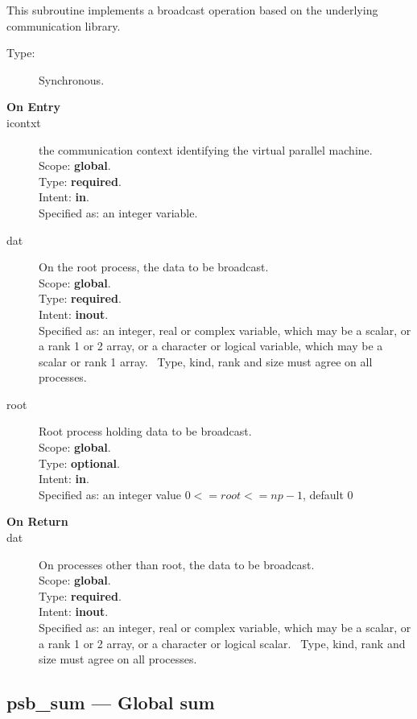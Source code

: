 This subroutine implements a broadcast operation based on the
underlying communication library. 
\begin{description}
\item[Type:] Synchronous.
\item[\bf  On Entry ]
\item[icontxt] the communication context identifying the virtual
  parallel machine.\\
Scope: {\bf global}.\\
Type: {\bf required}.\\
Intent: {\bf in}.\\
Specified as: an integer variable.
\item[dat] On the root process, the data to be broadcast.\\
Scope: {\bf global}.\\
Type: {\bf required}.\\
Intent: {\bf inout}.\\
Specified as: an integer, real or complex variable, which may be a
scalar, or a rank 1 or 2 array, or a character or logical variable,
which may be a scalar or rank 1 array. \
Type, kind, rank and size must agree on all processes.
\item[root] Root process holding data to be broadcast.\\
Scope: {\bf global}.\\
Type: {\bf optional}.\\
Intent: {\bf in}.\\
Specified as: an integer value $0<= root <= np-1$, default 0 \
\end{description}


\begin{description}
\item[\bf On Return]
\item[dat] On processes other than  root, the data to be broadcast.\\
Scope: {\bf global}.\\
Type: {\bf required}.\\
Intent: {\bf inout}.\\
Specified as: an integer, real or complex variable, which may be a
scalar, or a rank 1 or 2 array, or a character or logical scalar. \
Type, kind, rank and size must agree on all processes.
\end{description}


\clearpage\subsection*{psb\_sum --- Global sum}

